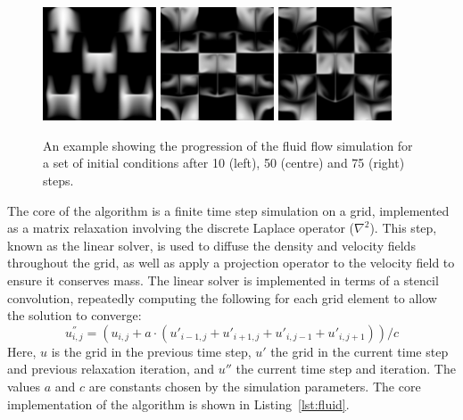 \begin{figure}
    \begin{center}
        \includegraphics[width=0.3\textwidth]{images/results/fluid/fluid-10}
        \includegraphics[width=0.3\textwidth]{images/results/fluid/fluid-50}
        \includegraphics[width=0.3\textwidth]{images/results/fluid/fluid-75}
    \end{center}
    \caption[Example of the fluid flow simulation]{An example showing the
        progression of the fluid flow simulation for a set of initial conditions
        after 10 (left), 50 (centre) and 75 (right) steps.}
    \label{fig:fluid_steps}
\end{figure}

The core of the algorithm is a finite time step simulation on a grid,
implemented as a matrix relaxation involving the discrete Laplace operator
($\nabla^2$). This step, known as the linear solver, is used to diffuse the
density and velocity fields throughout the grid, as well as apply a projection
operator to the velocity field to ensure it conserves mass. The linear solver is
implemented in terms of a stencil convolution, repeatedly computing the
following for each grid element to allow the solution to converge:
\[
u_{i,j}^{''} = \left( u_{i,j} + a \cdot \left( u'_{i-1,j}+u'_{i+1,j}+u'_{i,j-1}+u'_{i,j+1} \right) \right) / c
\]
Here, $u$ is the grid in the previous time step, $u'$ the grid in the current
time step and previous relaxation iteration, and $u''$ the current time step and
iteration. The values $a$ and $c$ are constants chosen by the simulation
parameters. The core implementation of the algorithm is shown in
Listing~\ref{lst:fluid}.

